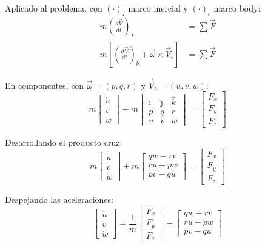 \documentclass[11pt,a4paper]{article}
\begin{document}
Aplicado al problema, con $(\cdot)_{I}$ marco inercial y $(\cdot)_{b}$ marco body:
\begin{align}
m\left(\frac{d\vec{V}}{dt}\right)_{I}&=\sum \vec{F}\\[4pt]
m\left[\left(\frac{d\vec{V}}{dt}\right)_{b}+\vec{\omega}\times\vec{V}_{b}\right]&=\sum \vec{F}
\end{align}

En componentes, con $\vec{\omega}=(p,q,r)$ y $\vec{V}_{b}=(u,v,w)$:
\begin{equation}
m\begin{bmatrix}\dot{u}\\[2pt]\dot{v}\\[2pt]\dot{w}\end{bmatrix}
+m\begin{vmatrix}\hat{\imath}&\hat{\jmath}&\hat{k}\\ p&q&r\\ u&v&w\end{vmatrix}
=\begin{bmatrix}F_{x}\\[2pt]F_{y}\\[2pt]F_{z}\end{bmatrix}
\end{equation}

Desarrollando el producto cruz:
\begin{equation}
m\begin{bmatrix}\dot{u}\\[2pt]\dot{v}\\[2pt]\dot{w}\end{bmatrix}
+m\begin{bmatrix}qw-rv\\[2pt]ru-pw\\[2pt]pv-qu\end{bmatrix}
=\begin{bmatrix}F_{x}\\[2pt]F_{y}\\[2pt]F_{z}\end{bmatrix}
\end{equation}

Despejando las aceleraciones:
\begin{equation}
\begin{bmatrix}\dot{u}\\[2pt]\dot{v}\\[2pt]\dot{w}\end{bmatrix}
=\frac{1}{m}\begin{bmatrix}F_{x}\\[2pt]F_{y}\\[2pt]F_{z}\end{bmatrix}
-\begin{bmatrix}qw-rv\\[2pt]ru-pw\\[2pt]pv-qu\end{bmatrix}
\end{equation}
\end{document}
